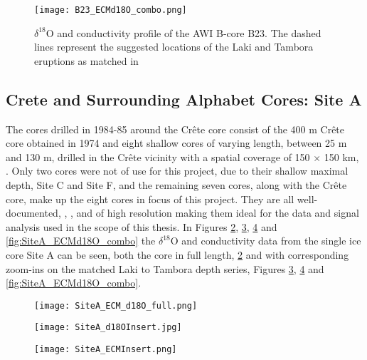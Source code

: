 \documentclass[../../CompleteThesis2/Complete_2ndDraft]{subfiles}
\begin{document}
\begin{figure}[h]
	\centering
	\texttt{[image: B23\_ECMd18O\_combo.png]}
	\caption[]{$\delta^{18}$O and conductivity profile of the AWI B-core B23. The dashed lines represent the suggested locations of the Laki and Tambora eruptions as matched in \cite[Weissbach et al. 2016]{Weissbach2016}}
	\label{fig:B23_ECMd18O_combo}
\end{figure}


\subsection[Crete Area][Crete Area]{Crete and Surrounding Alphabet Cores: Site A}
\label{Subsec:Data_Selection_Alhabet}
The cores drilled in 1984-85 around the Crête core consist of the 400 m Crête core obtained in 1974 \cite{bibid} and eight shallow cores of varying length, between 25 m and 130 m, drilled in the Crête vicinity with a spatial coverage of 150 $\times$ 150 km, \cite[Clausen, Gundestrup, Johnsen 1988]{Clausen1988}.
Only two cores were not of use for this project, due to their shallow maximal depth, Site C and Site F, and the remaining seven cores, along with the Crête core, make up the eight cores in focus of this project. They are all well-documented, \cite[Clausen \& Hammer, 1988]{ClausenHammer1988}, \cite[Clausen, Gundestrup, Johnsen 1988]{Clausen1988}, and of high resolution making them ideal for the data and signal analysis used in the scope of this thesis. In Figures \ref{fig:SiteA__ECM_d18O_full.png}, \ref{fig:SiteA_d18OInsert}, \ref{fig:SiteA_ECMInsert} and \ref{fig:SiteA_ECMd18O_combo} the $\delta^{18}$O and conductivity data from the single ice core Site A can be seen, both the core in full length, \ref{fig:SiteA__ECM_d18O_full.png} and with corresponding zoom-ins on the matched Laki to Tambora depth series, Figures \ref{fig:SiteA_d18OInsert}, \ref{fig:SiteA_ECMInsert} and \ref{fig:SiteA_ECMd18O_combo}.
\begin{figure}[h]
	\centering
	\texttt{[image: SiteA\_ECM\_d18O\_full.png]}
	\caption[]{}
	\label{fig:SiteA__ECM_d18O_full.png}
\end{figure}

\begin{figure}[h]
	\centering
	\texttt{[image: SiteA\_d18OInsert.jpg]}
	\caption[]{}
	\label{fig:SiteA_d18OInsert}
\end{figure}

\begin{figure}[h]
	\centering
	\texttt{[image: SiteA\_ECMInsert.png]}
	\caption[]{}
	\label{fig:SiteA_ECMInsert}
\end{figure}
\end{document}
